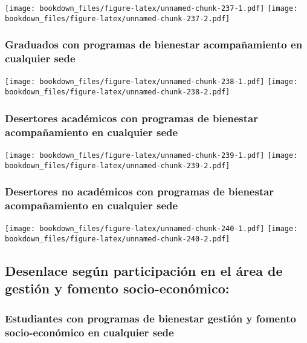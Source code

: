 \documentclass[]{article}
\theoremstyle{definition}
\theoremstyle{definition}
\theoremstyle{definition}
\theoremstyle{remark}
\begin{document}
\texttt{[image: bookdown\_files/figure-latex/unnamed-chunk-237-1.pdf]}
\texttt{[image: bookdown\_files/figure-latex/unnamed-chunk-237-2.pdf]}

\subsubsection{Graduados con programas de bienestar acompañamiento en
cualquier
sede}\label{graduados-con-programas-de-bienestar-acompanamiento-en-cualquier-sede-1}

\texttt{[image: bookdown\_files/figure-latex/unnamed-chunk-238-1.pdf]}
\texttt{[image: bookdown\_files/figure-latex/unnamed-chunk-238-2.pdf]}

\subsubsection{Desertores académicos con programas de bienestar
acompañamiento en cualquier
sede}\label{desertores-academicos-con-programas-de-bienestar-acompanamiento-en-cualquier-sede-1}

\texttt{[image: bookdown\_files/figure-latex/unnamed-chunk-239-1.pdf]}
\texttt{[image: bookdown\_files/figure-latex/unnamed-chunk-239-2.pdf]}

\subsubsection{Desertores no académicos con programas de bienestar
acompañamiento en cualquier
sede}\label{desertores-no-academicos-con-programas-de-bienestar-acompanamiento-en-cualquier-sede-1}

\texttt{[image: bookdown\_files/figure-latex/unnamed-chunk-240-1.pdf]}
\texttt{[image: bookdown\_files/figure-latex/unnamed-chunk-240-2.pdf]}

\subsection{Desenlace según participación en el área de gestión y
fomento
socio-económico:}\label{desenlace-segun-participacion-en-el-area-de-gestion-y-fomento-socio-economico-1}

\subsubsection{Estudiantes con programas de bienestar gestión y fomento
socio-económico en cualquier
sede}\label{estudiantes-con-programas-de-bienestar-gestion-y-fomento-socio-economico-en-cualquier-sede-1}
\end{document}
